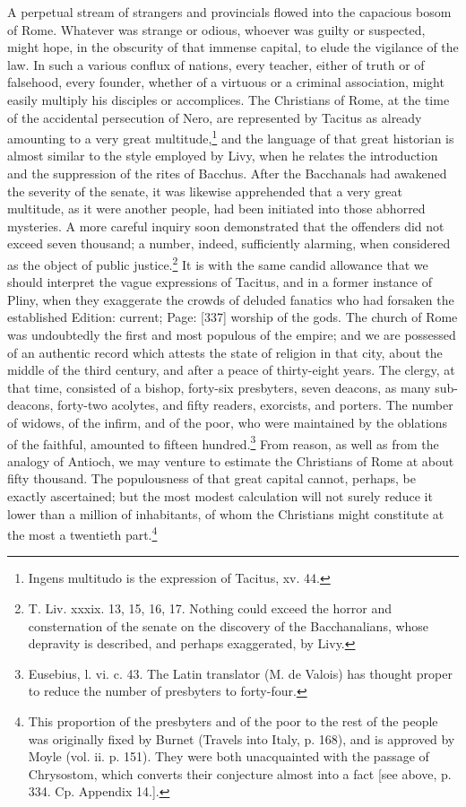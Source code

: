 A perpetual stream of strangers and provincials flowed into the capacious bosom of Rome. Whatever was strange or odious, whoever was guilty or suspected, might hope, in the obscurity of that immense capital, to elude the vigilance of the law. In such a various conflux of nations, every teacher, either of truth or of falsehood, every founder, whether of a virtuous or a criminal association, might easily multiply his disciples or accomplices. The Christians of Rome, at the time of the accidental persecution of Nero, are represented by Tacitus as already amounting to a very great multitude,\footnote{Ingens multitudo is the expression of Tacitus, xv. 44.} and the language of that great historian is almost similar to the style employed by Livy, when he relates the introduction and the suppression of the rites of Bacchus. After the Bacchanals had awakened the severity of the senate, it was likewise apprehended that a very great multitude, as it were another people, had been initiated into those abhorred mysteries. A more careful inquiry soon demonstrated that the offenders did not exceed seven thousand; a number, indeed, sufficiently alarming, when considered as the object of public justice.\footnote{T. Liv. xxxix. 13, 15, 16, 17. Nothing could exceed the horror and consternation of the senate on the discovery of the Bacchanalians, whose depravity is described, and perhaps exaggerated, by Livy.} It is with the same candid allowance that we should interpret the vague expressions of Tacitus, and in a former instance of Pliny, when they exaggerate the crowds of deluded fanatics who had forsaken the established Edition: current; Page: [337] worship of the gods. The church of Rome was undoubtedly the first and most populous of the empire; and we are possessed of an authentic record which attests the state of religion in that city, about the middle of the third century, and after a peace of thirty-eight years. The clergy, at that time, consisted of a bishop, forty-six presbyters, seven deacons, as many sub-deacons, forty-two acolytes, and fifty readers, exorcists, and porters. The number of widows, of the infirm, and of the poor, who were maintained by the oblations of the faithful, amounted to fifteen hundred.\footnote{Eusebius, l. vi. c. 43. The Latin translator (M. de Valois) has thought proper to reduce the number of presbyters to forty-four.} From reason, as well as from the analogy of Antioch, we may venture to estimate the Christians of Rome at about fifty thousand. The populousness of that great capital cannot, perhaps, be exactly ascertained; but the most modest calculation will not surely reduce it lower than a million of inhabitants, of whom the Christians might constitute at the most a twentieth part.\footnote{This proportion of the presbyters and of the poor to the rest of the people was originally fixed by Burnet (Travels into Italy, p. 168), and is approved by Moyle (vol. ii. p. 151). They were both unacquainted with the passage of Chrysostom, which converts their conjecture almost into a fact [see above, p. 334. Cp. Appendix 14.].}

